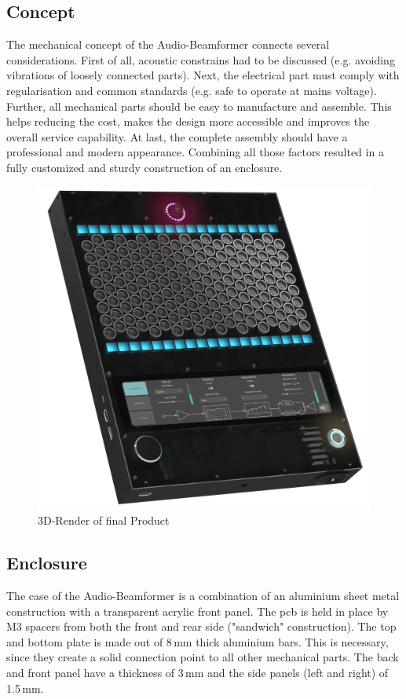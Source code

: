 \subsection{Concept}
The mechanical concept of the Audio-Beamformer connects several considerations. First of all, acoustic constrains had to be discussed (e.g. avoiding vibrations of loosely connected parts). Next, the electrical part must comply with regularisation and common standards (e.g. safe to operate at mains voltage). Further, all mechanical parts should be easy to manufacture and assemble. This helps reducing the cost, makes the design more accessible and improves the overall service capability. At last, the complete assembly should have a professional and modern appearance. Combining all those factors resulted in a fully customized  and sturdy construction of an enclosure.

\bigskip
\begin{figure}[h!]
	\centering
	\includegraphics[width=13cm]{images/4_Design/Mechanical/Audio-Beamformer_Case.jpg}
	\vspace{0.0cm}
    \caption{3D-Render of final Product}
    \label{fig:final_product_render}
\end{figure}
\newpage

\subsection{Enclosure}
The case of the Audio-Beamformer is a combination of an aluminium sheet metal construction with a transparent acrylic front panel. The \acrshort{pcb} is held in place by M3 spacers from both the front and rear side ("sandwich" construction). The top and bottom plate is made out of 8\,mm thick aluminium bars. This is necessary, since they create a solid connection point to all other mechanical parts. The back and front panel have a thickness of 3\,mm and the side panels (left and right) of 1.5\,mm.

